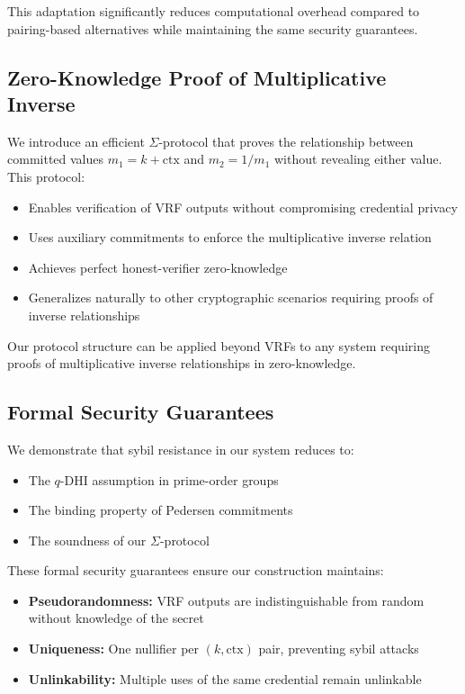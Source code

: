 This adaptation significantly reduces computational overhead compared to pairing-based alternatives while maintaining the same security guarantees.

\subsection{Zero-Knowledge Proof of Multiplicative Inverse}

We introduce an efficient $\Sigma$-protocol that proves the relationship between committed values $m_1 = k+\text{ctx}$ and $m_2 = 1/m_1$ without revealing either value. This protocol:

\begin{itemize}
    \item Enables verification of VRF outputs without compromising credential privacy
    \item Uses auxiliary commitments to enforce the multiplicative inverse relation
    \item Achieves perfect honest-verifier zero-knowledge
    \item Generalizes naturally to other cryptographic scenarios requiring proofs of inverse relationships
\end{itemize}

Our protocol structure can be applied beyond VRFs to any system requiring proofs of multiplicative inverse relationships in zero-knowledge.

\subsection{Formal Security Guarantees}

We demonstrate that sybil resistance in our system reduces to:
\begin{itemize}
    \item The $q$-DHI assumption in prime-order groups
    \item The binding property of Pedersen commitments
    \item The soundness of our $\Sigma$-protocol
\end{itemize}

These formal security guarantees ensure our construction maintains:
\begin{itemize}
    \item \textbf{Pseudorandomness:} VRF outputs are indistinguishable from random without knowledge of the secret
    \item \textbf{Uniqueness:} One nullifier per $(k,\text{ctx})$ pair, preventing sybil attacks
    \item \textbf{Unlinkability:} Multiple uses of the same credential remain unlinkable
\end{itemize}

